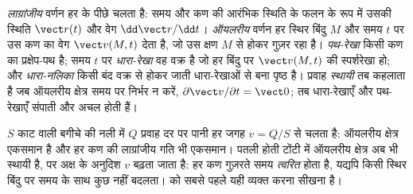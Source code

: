 \begin{definition}[लाग्रांजीय और ऑयलरीय वर्णन]\label{def:b2:fluid-kinematics:euler}
\emph{लाग्रांजीय} वर्णन हर  के पीछे चलता है: समय और कण की आरंभिक
स्थिति के फलन के रूप में उसकी स्थिति $\vect r(t)$ और वेग $\dd\vect r/\dd t$।
\emph{ऑयलरीय} वर्णन हर स्थिर
बिंदु $M$ और समय $t$ पर उस कण का वेग $\vect v(M, t)$ देता है, जो
उस क्षण $M$ से होकर गुज़र रहा है। \emph{पथ-रेखा}
किसी कण का प्रक्षेप-पथ है; समय $t$ पर \emph{धारा-रेखा} वह
वक्र है जो हर बिंदु पर $\vect v(M, t)$ की स्पर्शरेखा हो; और
\emph{धारा-नलिका} किसी बंद वक्र से होकर जाती धारा-रेखाओं से बना पृष्ठ है।
प्रवाह \emph{स्थायी} तब कहलाता है जब ऑयलरीय क्षेत्र समय पर
निर्भर न करें, $\partial\vect v/\partial t = \vect 0$; तब धारा-रेखाएँ और पथ-रेखाएँ
संपाती और अचल होती हैं।
\end{definition}

\begin{example}[एक ही प्रवाह के दो वर्णन]\label{ex:b2:fluid-kinematics:hose}
$S$ काट वाली बगीचे की नली में $Q$ प्रवाह दर पर पानी हर जगह $v = Q/S$
से चलता है: ऑयलरीय क्षेत्र एकसमान है और हर कण की
लाग्रांजीय गति भी एकसमान। पतली होती टोंटी में ऑयलरीय क्षेत्र
अब भी स्थायी है, पर अक्ष के अनुदिश $v$ बढ़ता जाता है: हर कण गुज़रते
समय \emph{त्वरित} होता है, यद्यपि किसी स्थिर
बिंदु पर समय के साथ कुछ नहीं बदलता।  को सबसे पहले यही
व्यक्त करना सीखना है।
\end{example}

